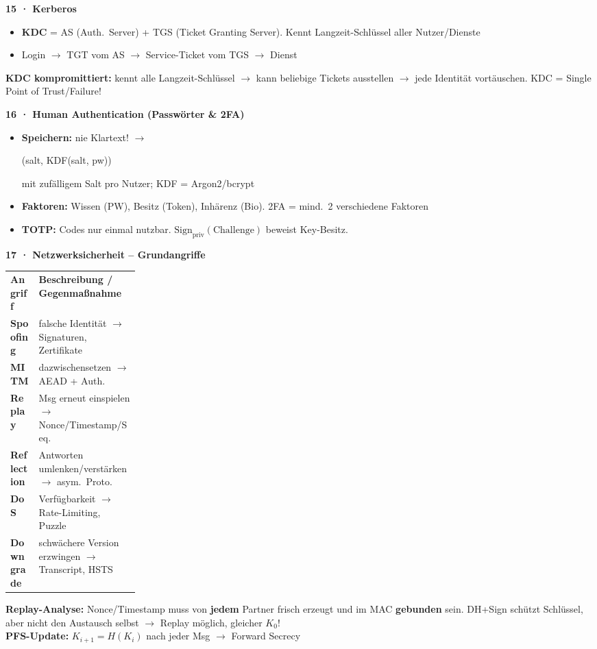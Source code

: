 \documentclass[11pt,a4paper]{article}
\newcommand{\tabstart}{%
  \rowcolors{2}{rowgray}{white}%
}
\newcommand{\tabend}{\rowcolors{1}{}{}}
\newcommand{\h}[1]{%
  \vspace{3pt}%
  \noindent\colorbox{hdr2}{%
    \parbox{\dimexpr\linewidth-2\fboxsep}{\color{white}\bfseries #1}}%
  \par\vspace{1pt}%
}
\newenvironment{ibox}{\begin{mdframed}[style=infoS]}{\end{mdframed}}
\newenvironment{wbox}{\begin{mdframed}[style=warnS]}{\end{mdframed}}
\newcommand{\cd}[1]{{\small\ttfamily\colorbox{codebg}{\strut #1}}}
\newcommand{\THH}[1]{\cellcolor{hdrtbl}\color{white}\textbf{#1}}
\begin{document}
\begin{multicols}{2}
\h{15 · Kerberos}
\begin{itemize}
\item \textbf{KDC} = AS (Auth.\ Server) + TGS (Ticket Granting Server).
  Kennt Langzeit-Schlüssel aller Nutzer/Dienste
\item Login $\to$ TGT vom AS $\to$ Service-Ticket vom TGS $\to$ Dienst
\end{itemize}
\begin{wbox}
\textbf{KDC kompromittiert:} kennt alle Langzeit-Schlüssel $\to$
kann beliebige Tickets ausstellen $\to$ jede Identität vortäuschen.
KDC = Single Point of Trust/Failure!
\end{wbox}

\newpage

\h{16 · Human Authentication (Passwörter \& 2FA)}
\begin{itemize}
\item \textbf{Speichern:} nie Klartext! $\to$ \cd{(salt, KDF(salt, pw))}
  mit zufälligem Salt pro Nutzer; KDF = Argon2/bcrypt
\item \textbf{Faktoren:} Wissen (PW), Besitz (Token), Inhärenz (Bio).
  2FA = mind.\ 2 verschiedene Faktoren
\item \textbf{TOTP:} Codes nur einmal nutzbar.
  $\mathrm{Sign}_{\mathrm{priv}}(\mathrm{Challenge})$ beweist Key-Besitz.
\end{itemize}

\h{17 · Netzwerksicherheit -- Grundangriffe}

\tabstart
\begin{tabularx}{\linewidth}{K{0.22\linewidth}L}
\THH{Angriff} & \THH{Beschreibung / Gegenmaßnahme}\\
\textbf{Spoofing}   & falsche Identität $\to$ Signaturen, Zertifikate\\
\textbf{MITM}       & dazwischensetzen $\to$ AEAD + Auth.\\
\textbf{Replay}     & Msg erneut einspielen $\to$ Nonce/Timestamp/Seq.\\
\textbf{Reflection} & Antworten umlenken/verstärken $\to$ asym.\ Proto.\\
\textbf{DoS}        & Verfügbarkeit $\to$ Rate-Limiting, Puzzle\\
\textbf{Downgrade}  & schwächere Version erzwingen $\to$ Transcript, HSTS\\
\end{tabularx}
\tabend

\begin{ibox}
\textbf{Replay-Analyse:} Nonce/Timestamp muss von \textbf{jedem} Partner
frisch erzeugt und im MAC \textbf{gebunden} sein.
DH+Sign schützt Schlüssel, aber nicht den Austausch selbst
$\to$ Replay möglich, gleicher $K_0$!\\
\textbf{PFS-Update:} $K_{i+1}=H(K_i)$ nach jeder Msg
$\to$ Forward Secrecy
\end{ibox}


\end{multicols}
\end{document}
